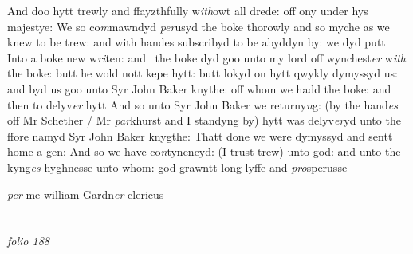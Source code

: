 \documentclass[12pt, a4paper]{book}
\begin{document}
            			
		\ifthenelse{\isodd{\thepage}}
		{\reversemarginpar}
		{\normalmarginpar}
		And doo hytt trewly and ffayzthfully w\textit{ith}owt all drede: off ony under hys majestye: We so co\textit{m}mawndyd \textit{per}usyd the boke thorowly and so myche as we knew to be trew: and with handes subscribyd 
			to be abyddyn by: we dyd putt Into a boke new w\textit{ri}ten: \sout{and }
            				the boke 
			dyd goo unto my lord off wynchest\textit{er} w\textit{ith}
            		\sout{the boke}: butt he wold nott kepe \sout{hytt}: butt lokyd on hytt
			 qwykly dymyssyd us:  and byd us goo unto Syr John Baker knythe: off whom we hadd the boke: and then to delyv\textit{er} hytt
			 And so unto Syr John Baker we returny\textit{n}g: (by the hand\textit{es} off Mr Schether / Mr \textit{par}khurst and I standyng by) hytt was delyv\textit{er}yd unto the ffore namyd Syr John Baker knygthe: Thatt done we were dymyssyd and sentt home a gen: And so we have co\textit{n}tyneneyd: (I trust trew) unto god: and unto the kyng\textit{es} hyghnesse unto whom: god grawntt long lyffe and \textit{pro}sperusse
            		
            		
            			
		\ifthenelse{\isodd{\thepage}}
		{\reversemarginpar}
		{\normalmarginpar}
		\textit{per }me william Gardn\textit{er} clericus
            		
            		
            		
            		
        
            		
\dotfill
						\newpage {} \section*{}

\textit{folio 188}
      				
      				
      				
      				
      					
\end{document}
